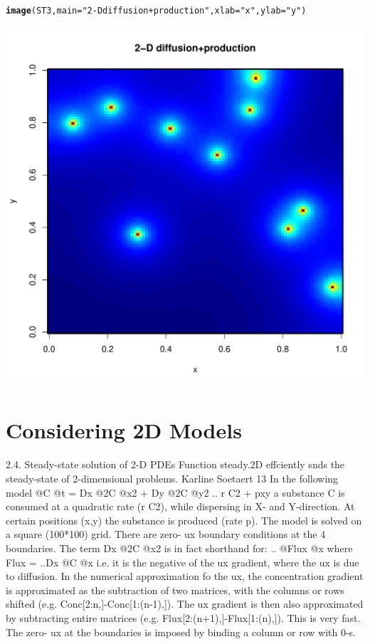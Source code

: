 \documentclass{tufte-handout}\usepackage[]{graphicx}\usepackage[]{xcolor}
\makeatletter
\def\maxwidth{ %
  \ifdim\Gin@nat@width>\linewidth
    \linewidth
  \else
    \Gin@nat@width
  \fi
}
\newcommand{\hlstr}[1]{\textcolor[rgb]{0.192,0.494,0.8}{#1}}%
\newcommand{\hlstd}[1]{\textcolor[rgb]{0.345,0.345,0.345}{#1}}%
\newcommand{\hlkwc}[1]{\textcolor[rgb]{0.333,0.667,0.333}{#1}}%
\newcommand{\hlkwd}[1]{\textcolor[rgb]{0.737,0.353,0.396}{\textbf{#1}}}%
\newenvironment{kframe}{%
 \def\at@end@of@kframe{}%
 \ifinner\ifhmode%
  \def\at@end@of@kframe{\end{minipage}}%
  \begin{minipage}{\columnwidth}%
 \fi\fi%
 \def\FrameCommand##1{\hskip\@totalleftmargin \hskip-\fboxsep
 \colorbox{shadecolor}{##1}\hskip-\fboxsep
     \hskip-\linewidth \hskip-\@totalleftmargin \hskip\columnwidth}%
 \MakeFramed {\advance\hsize-\width
   \@totalleftmargin\z@ \linewidth\hsize
   \@setminipage}}%
 {\par\unskip\endMakeFramed%
 \at@end@of@kframe}
\newenvironment{knitrout}{}{} %
\makeatother
\begin{document}
\begin{knitrout}
\color{fgcolor}\begin{kframe}
\begin{alltt}
\hlkwd{image}\hlstd{(ST3,}\hlkwc{main}\hlstd{=}\hlstr{"2-D diffusion+production"}\hlstd{,} \hlkwc{xlab}\hlstd{=}\hlstr{"x"}\hlstd{,} \hlkwc{ylab}\hlstd{=}\hlstr{"y"}\hlstd{)}
\end{alltt}
\end{kframe}
\includegraphics[width=\maxwidth]{figure/unnamed-chunk-16-1} 
\end{knitrout}


\section{Considering 2D Models}

2.4. Steady-state solution of 2-D PDEs
Function steady.2D effciently snds the steady-state of 2-dimensional problems.
Karline Soetaert 13
In the following model
@C
@t
= Dx 
@2C
@x2 + Dy 
@2C
@y2
.. r  C2 + pxy
a substance C is consumed at a quadratic rate (r C2), while dispersing in X- and Y-direction.
At certain positions (x,y) the substance is produced (rate p).
The model is solved on a square (100*100) grid. There are zero-
ux boundary conditions at
the 4 boundaries.
The term Dx  @2C
@x2 is in fact shorthand for:
..
@Flux
@x
where
Flux = ..Dx 
@C
@x
i.e. it is the negative of the 
ux gradient, where the 
ux is due to diffusion.
In the numerical approximation fo the 
ux, the concentration gradient is approximated as the
subtraction of two matrices, with the columns or rows shifted (e.g. Conc[2:n,]-Conc[1:(n-1),]).
The 
ux gradient is then also approximated by subtracting entire matrices
(e.g. Flux[2:(n+1),]-Flux[1:(n),]). This is very fast. The zero-
ux at the boundaries is
imposed by binding a column or row with 0-s.
\end{document}
